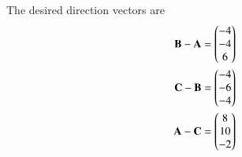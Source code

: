 The desired direction vectors are
\begin{align}
    \mathbf{B}-\mathbf{A} & = \begin{pmatrix}-4\\-4\\6\end{pmatrix}
    \\
    \mathbf{C}-\mathbf{B} &=  \begin{pmatrix}-4\\-6\\-4\end{pmatrix}
    \\
    \mathbf{A}-\mathbf{C} &= \begin{pmatrix}8\\10\\-2\end{pmatrix}
\end{align}
